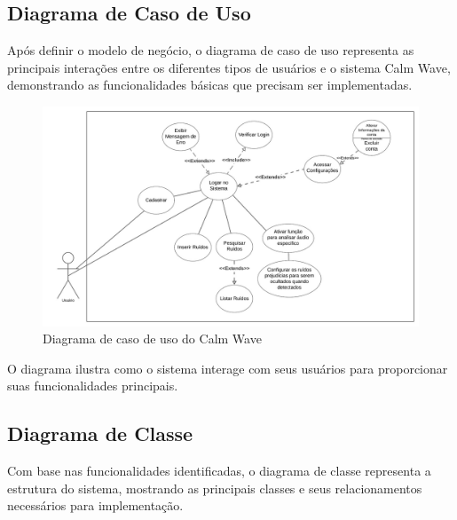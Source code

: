 \documentclass[
  a4paper,
  12pt,
  english,
  brazilian,
]{article}
\begin{document}
\subsection*{Diagrama de Caso de Uso}

Após definir o modelo de negócio, o diagrama de caso de uso representa as principais interações entre os diferentes tipos de usuários e o sistema Calm Wave, demonstrando as funcionalidades básicas que precisam ser implementadas.

\begin{figure}[H]
\centering
\caption{Diagrama de caso de uso do Calm Wave}%
\label{fig:diagrama-caso-uso}
\includegraphics[width=1.1\textwidth]{Logos/Caso_de_uso.jpg}
\end{figure}

O diagrama ilustra como o sistema interage com seus usuários para proporcionar suas funcionalidades principais.

\subsection*{Diagrama de Classe}

Com base nas funcionalidades identificadas, o diagrama de classe representa a estrutura do sistema, mostrando as principais classes e seus relacionamentos necessários para implementação.
\end{document}
